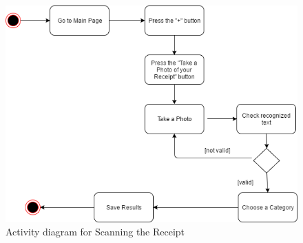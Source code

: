 \begin{figure}[H]
	\centering
	\includegraphics[width=18cm]{Chapter2/activityscan.png}
	\caption{Activity diagram for Scanning the Receipt}
	\label{fig:secondactivity}
\end{figure}

